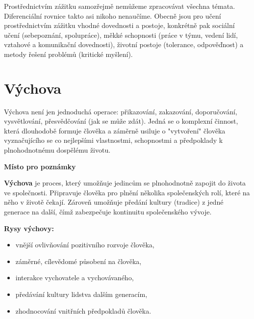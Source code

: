 \documentclass[a4paper,12pt,final]{report}
\begin{document}
Prostřednictvím zážitku samozřejmě nemůžeme zpracovávat všechna témata. Diferenciální rovnice takto asi nikoho nenaučíme. Obecně jsou pro učení prostřednictvím zážitku vhodné dovednosti a postoje, konkrétně pak sociální učení (sebepoznání, spolupráce), měkké schopnosti (práce v týmu, vedení lidí, vztahové a komunikační dovednosti), životní postoje (tolerance, odpověďnost) a metody řešení problémů (kritické myšlení).


\section[Výchova]{Výchova}\pagelogos
Výchova není jen jednoduchá operace: přikazování, zakazování, doporučování, vysvětlování, přesvědčování (jak se může zdát). Jedná se o komplexní činnost, která dlouhodobě formuje člověka a záměrně usiluje o "vytvoření" člověka vyznačujícího se co nejlepšími vlastnostmi, schopnostmi a předpoklady k plnohodnotnému dospělému životu.

\begin{samepage}\begin{flushleft}
\end{flushleft}
\textbf{Místo pro poznámky}
\vspace{5cm}\pagelogos
\end{samepage}

\textbf{Výchova} je proces, který umožňuje jedincům se plnohodnotně zapojit do života ve společnosti. Připravuje člověka pro plnění několika společenských rolí, které na něho v životě čekají. Zároveň umožňuje předání kultury (tradice) z jedné generace na další, čímž zabezpečuje kontinuitu společenského vývoje.

\textbf{Rysy výchovy:}
\begin{itemize}
 \item vnější ovlivňování pozitivního rozvoje člověka,
 \item záměrné, cílevědomé působení na člověka,
 \item interakce vychovatele a vychovávaného,
 \item předávání kultury lidstva dalším generacím,
 \item zhodnocování vnitřních předpokladů člověka.
\end{itemize}
\end{document}
